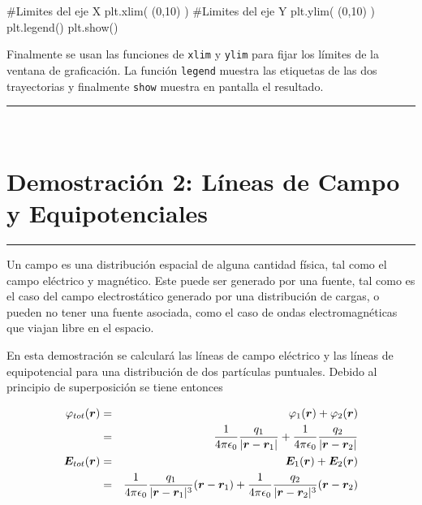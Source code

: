 \begin{listing}[style=python, numbers = none]
#Limites del eje X
plt.xlim( (0,10) )
#Limites del eje Y
plt.ylim( (0,10) )
plt.legend()
plt.show()
\end{listing}
Finalmente se usan las funciones de \matplotlib \texttt{xlim} y \texttt{ylim}
para fijar los límites de la ventana de graficación. La función 
\texttt{legend} muestra las etiquetas de las dos trayectorias y finalmente
\texttt{show} muestra en pantalla el resultado.


\rule{14cm}{0.5mm}



\
\section{Demostración 2: Líneas de Campo y Equipotenciales}
\label{sec:DEMO2_02}
\rule{14cm}{0.5mm}


Un campo es una distribución espacial de alguna cantidad física, tal como 
el campo eléctrico y magnético. Este puede ser generado por una fuente, tal
como es el caso del campo electrostático generado por una distribución de 
cargas, o pueden no tener una fuente asociada, como el caso de ondas 
electromagnéticas que viajan libre en el espacio.


En esta demostración se calculará las líneas de campo eléctrico y las 
líneas de equipotencial para una distribución de dos partículas puntuales.
Debido al principio de superposición se tiene entonces


\begin{eqnarray}
\label{eq:total_phi}
\varphi_{tot}(\boldsymbol{ r }) &=& \varphi_1(\boldsymbol{ r }) + \varphi_2(\boldsymbol{ r }) \\
\nonumber
&=& \frac{1}{4\pi \epsilon_0}\frac{q_1}{|\boldsymbol{ r } - \boldsymbol{ r }_1|} + 
\frac{1}{4\pi \epsilon_0}\frac{q_2}{|\boldsymbol{ r } - \boldsymbol{ r }_2|} \\
\label{eq:total_E}
\boldsymbol{ E }_{tot}(\boldsymbol{ r }) &=& \boldsymbol{ E }_1(\boldsymbol{ r }) + \boldsymbol{ E }_2(\boldsymbol{ r }) \\
\nonumber
&=& \frac{1}{4\pi \epsilon_0}\frac{q_1}{|\boldsymbol{ r } - \boldsymbol{ r }_1|^3}(\boldsymbol{ r } - \boldsymbol{ r }_1) + 
\frac{1}{4\pi \epsilon_0}\frac{q_2}{|\boldsymbol{ r } - \boldsymbol{ r }_2|^3}(\boldsymbol{ r } - \boldsymbol{ r }_2)
\end{eqnarray}


